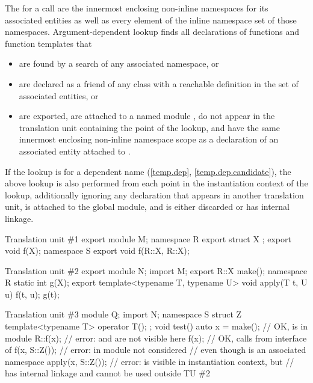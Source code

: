 \pnum
The  for a call are
the innermost enclosing non-inline namespaces for its associated entities
as well as every element of the inline namespace set
of those namespaces.
Argument-dependent lookup finds
all declarations of functions and function templates that
\begin{itemize}
\item
are found by a search of any associated namespace, or
\item
are declared as a friend of any class
with a reachable definition in the set of associated entities, or
\item
are exported,
are attached to a named module ,
do not appear in the translation unit containing the point of the lookup, and
have the same innermost enclosing non-inline namespace scope as
a declaration of an associated entity attached to .
\end{itemize}
If the lookup is for a dependent name (\ref{temp.dep}, \ref{temp.dep.candidate}),
the above lookup is also performed
from each point in the instantiation context of the lookup,
additionally ignoring any declaration that
appears in another translation unit,
is attached to the global module, and
is either discarded or has internal linkage.

\pnum
\begin{example}
\begin{codeblocktu}{Translation unit \#1}
export module M;
namespace R {
  export struct X {};
  export void f(X);
}
namespace S {
  export void f(R::X, R::X);
}
\end{codeblocktu}

\begin{codeblocktu}{Translation unit \#2}
export module N;
import M;
export R::X make();
namespace R { static int g(X); }
export template<typename T, typename U> void apply(T t, U u) {
  f(t, u);
  g(t);
}
\end{codeblocktu}

\begin{codeblocktu}{Translation unit \#3}
module Q;
import N;
namespace S {
  struct Z { template<typename T> operator T(); };
}
void test() {
  auto x = make();              // OK,  is  in module 
  R::f(x);                      // error:  and  are not visible here
  f(x);                         // OK, calls  from interface of 
  f(x, S::Z());                 // error:  in module  not considered
                                // even though  is an associated namespace
  apply(x, S::Z());             // error:  is visible in instantiation context, but
                                //  has internal linkage and cannot be used outside TU \#2
}
\end{codeblocktu}
\end{example}

